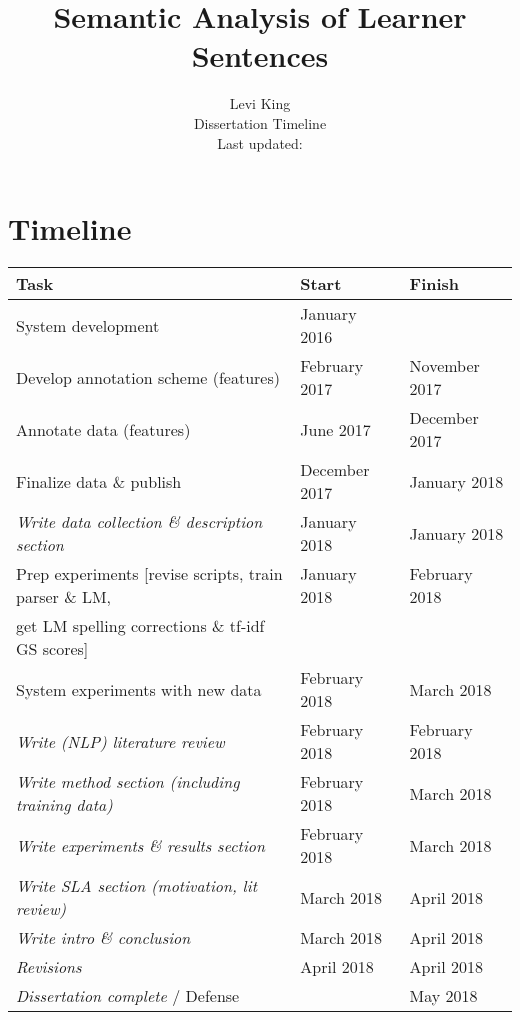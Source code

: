 \documentclass[11pt]{article}
\title{Semantic Analysis of Learner Sentences}
\author{Levi King \\ Dissertation Timeline \\ Last updated: \\}
\begin{document}
\maketitle

\section{Timeline}
\begin{center}
\begin{tabular}{|l|l|l|}
  \hline
  \textbf{Task} & \textbf{Start} & \textbf{Finish} \\
  \hline
  \hline
  System development & January 2016 &  \\
  \hline
  Develop annotation scheme (features) & February 2017 & November 2017 \\
  \hline
  Annotate data (features) & June 2017 & December 2017 \\
  \hline
  Finalize data \& publish & December 2017 & January 2018 \\
  \hline
  \textit{Write data collection \& description section} & January 2018 & January 2018 \\
  \hline
  Prep experiments [revise scripts, train parser \& LM, & January 2018 & February 2018 \\ 
  get LM spelling corrections \& tf-idf GS scores] & & \\
  \hline
  System experiments with new data & February 2018 & March 2018 \\
  \hline
  \textit{Write (NLP) literature review} & February 2018 & February 2018 \\
  \hline
  \textit{Write method section (including training data)} & February 2018 & March 2018 \\
  \hline
  \textit{Write experiments \& results section} & February 2018 & March 2018 \\  \hline
  \textit{Write SLA section (motivation, lit review)} & March 2018 & April 2018 \\
  \hline
  \textit{Write intro \& conclusion} & March 2018 & April 2018 \\
  \hline
  \textit{Revisions} & April 2018 & April 2018 \\
  \hline
  \textit{Dissertation complete} / Defense & & May 2018 \\
  \hline
\end{tabular}
\end{center}
\end{document}
